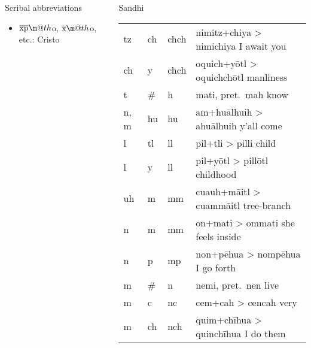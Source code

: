 \documentclass[12pt]{beamer}
\makeatletter
\newcommand*{\textoverline}[1]{$\overline{\hbox{#1}}\m@th$}
\newcommand{\nah}[1]{\textcolor{nahgrn}{#1}}
\newcommand{\trs}[1]{\textcolor{nahblu}{#1}}
\makeatother
\begin{document}
\begin{frame}
\begin{columns}[t]
\begin{column}{.22\linewidth}
\begin{block}{Scribal abbreviations}
\begin{multicols}{2}
\begin{itemize}
            \item \nah{\textoverline{xp}o, \textoverline{x}o}, etc.: \nah{Cristo}
          \end{itemize}
        \end{multicols}
      \end{block}
    \end{column}
    \begin{column}{.25\linewidth}
      \begin{block}{Sandhi}
        \begin{threeparttable}
          \begin{tabular}{l@{+}l@{>}ll}
            \nah{tz}   & \nah{ch} & \nah{chch}\tnote{1}   & \nah{nimitz}+\nah{chiya} > \nah{nimichiya} \trs{I await you}    \\
            \nah{ch}   & \nah{y}  & \nah{chch}\tnote{1}   & \nah{oquich}+\nah{yōtl} > \nah{oquichchōtl} \trs{manliness}     \\
            \nah{t}    & \nah{\#} & \nah{h}               & \nah{mati}, pret.~\nah{mah} \trs{know}                          \\
            \nah{n, m} & \nah{hu} & \nah{hu}              & \nah{am}+\nah{huālhuih} > \nah{ahuālhuih} \trs{y'all come}      \\
            \nah{l}    & \nah{tl} & \nah{ll}              & \nah{pil}+\nah{tli} > \nah{pilli} \trs{child}                   \\
            \nah{l}    & \nah{y}  & \nah{ll}              & \nah{pil}+\nah{yōtl} > \nah{pillōtl} \trs{childhood}            \\
            \nah{uh}   & \nah{m}  & \nah{mm}              & \nah{cuauh}+\nah{māitl} > \nah{cuammāitl} \trs{tree-branch}     \\
            \nah{n}    & \nah{m}  & \nah{mm}              & \nah{on}+\nah{mati} > \nah{ommati} \trs{she feels inside}       \\
            \nah{n}    & \nah{p}  & \nah{mp}              & \nah{non}+\nah{pēhua} > \nah{nompēhua} \trs{I go forth}         \\
            \nah{m}    & \nah{\#} & \nah{n}               & \nah{nemi}, pret.~\nah{nen} \trs{live}                          \\
            \nah{m}    & \nah{c}  & \nah{nc}              & \nah{cem}+\nah{cah} > \nah{cencah} \trs{very}                   \\
            \nah{m}    & \nah{ch} & \nah{nch}             & \nah{quim}+\nah{chīhua} > \nah{quinchīhua} \trs{I do them}      \\

\end{tabular}
\end{threeparttable}
\end{block}
\end{column}
\end{columns}
\end{frame}
\end{document}
